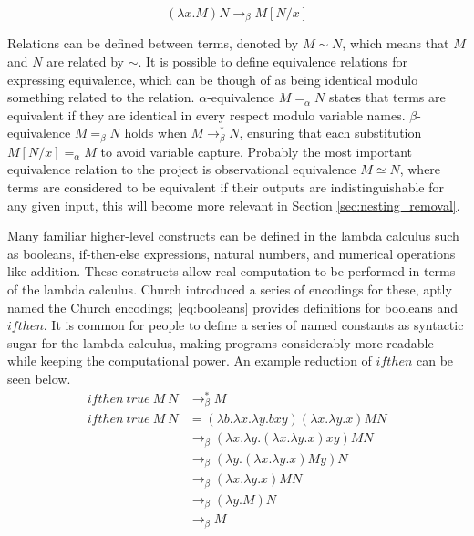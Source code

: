 \documentclass[12pt,a4paper]{report}
\theoremstyle{definition}
\theoremstyle{remark}
\begin{document}
\begin{equation}\label{eq:beta_reduction}
   (\lambda x.M)N \rightarrow_{\beta} M[N/x]
\end{equation}

Relations can be defined between terms, denoted by $M \sim N$, which means that $M$ and $N$ are related by $\sim$. It is possible to define equivalence relations for expressing equivalence, which can be though of as being identical modulo something related to the relation. $\alpha$-equivalence $M =_{\alpha} N$ states that terms are equivalent if they are identical in every respect modulo variable names. $\beta$-equivalence $M =_{\beta} N$ holds when $M \rightarrow_{\beta}^* N$, ensuring that each substitution $M[N/x] =_{\alpha} M$ to avoid variable capture. Probably the most important equivalence relation to the project is observational equivalence $M \simeq N$, where terms are considered to be equivalent if their outputs are indistinguishable for any given input, this will become more relevant in Section \ref{sec:nesting_removal}.

Many familiar higher-level constructs can be defined in the lambda calculus such as booleans, if-then-else expressions, natural numbers, and numerical operations like addition. These constructs allow real computation to be performed in terms of the lambda calculus. Church introduced a series of encodings for these, aptly named the Church encodings; \eqref{eq:booleans} provides definitions for booleans and $ifthen$. It is common for people to define a series of named constants as syntactic sugar for the lambda calculus, making programs considerably more readable while keeping the computational power. An example reduction of $ifthen$ can be seen below.
\begin{equation*}
\begin{split}
ifthen\ true\ M\ N &\rightarrow_{\beta}^* M\\
ifthen\ true\ M\ N &= (\lambda b. \lambda x.\lambda y.bxy)(\lambda x.\lambda y.x) M N\\
& \rightarrow_{\beta} (\lambda x. \lambda y.(\lambda x.\lambda y.x) x y) M N\\
& \rightarrow_{\beta} (\lambda y.(\lambda x.\lambda y.x) M y) N\\
& \rightarrow_{\beta} (\lambda x.\lambda y.x) M N\\
& \rightarrow_{\beta} (\lambda y.M) N\\
& \rightarrow_{\beta} M
\end{split}
\end{equation*}
\end{document}

